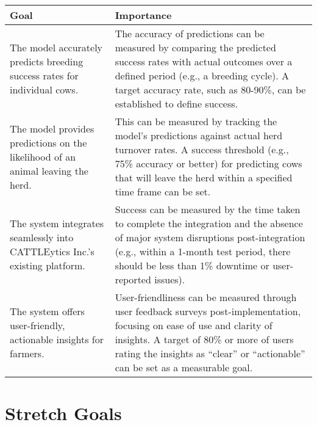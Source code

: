 \documentclass{article}
\begin{document}
\begin{table}[H]
\centering
\begin{tabularx}{\textwidth}{|p{}|p{}|} %
\hline
\textbf{Goal} & \textbf{Importance} \\ \hline
The model accurately predicts breeding success rates for individual cows. & The accuracy of predictions can be measured by comparing the predicted success rates with actual outcomes over a defined period (e.g., a breeding cycle). A target accuracy rate, such as 80-90\%, can be established to define success. \\ \hline
The model provides predictions on the likelihood of an animal leaving the herd. & This can be measured by tracking the model's predictions against actual herd turnover rates. A success threshold (e.g., 75\% accuracy or better) for predicting cows that will leave the herd within a specified time frame can be set. \\ \hline
The system integrates seamlessly into CATTLEytics Inc.'s existing platform. & Success can be measured by the time taken to complete the integration and the absence of major system disruptions post-integration (e.g., within a 1-month test period, there should be less than 1\% downtime or user-reported issues). \\ \hline
The system offers user-friendly, actionable insights for farmers. & User-friendliness can be measured through user feedback surveys post-implementation, focusing on ease of use and clarity of insights. A target of 80\% or more of users rating the insights as “clear” or “actionable” can be set as a measurable goal. \\ \hline

\end{tabularx}
\end{table}

\FloatBarrier

\section{Stretch Goals}
\end{document}
